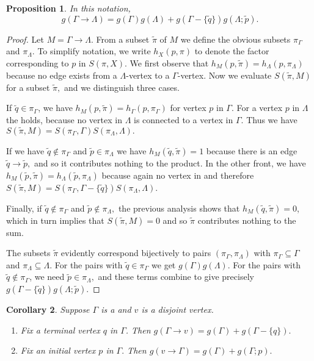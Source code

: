 \documentclass[draft]{article}
\newcommand{\qo}{\tilde{q}}
\newcommand{\pin}{\tilde{p}}
\newcommand{\tilpi}{\tilde{\pi}}
\newcommand{\piga}{\pi_\Gamma}
\newcommand{\pila}{\pi_\Lambda}
\theoremstyle{plain}
\newtheorem{prop}{Proposition}[section]
\newtheorem{cor}[prop]{Corollary}
\theoremstyle{definition}
\begin{document}
\begin{prop}
	In this notation, \eqnspace \begin{equation*} g(\Gamma \rightarrow \Lambda) = g(\Gamma)g(\Lambda) + g(\Gamma - \{\qo\})g(\Lambda; \pin). \end{equation*}
\end{prop}
\begin{proof}
	Let $M = \Gamma \rightarrow \Lambda.$ From a subset $\tilpi$ of $M$ we define the obvious subsets $\piga$ and $\pila.$ To simplify notation, we write $h_X(p, \pi)$ to denote the factor corresponding to $p$ in $S(\pi, X).$ We first observe that $h_M(p, \tilpi) = h_\Lambda(p, \pila)$ because no edge exists from a $\Lambda$-vertex to a $\Gamma$-vertex. Now we evaluate $S(\tilpi, M)$ for a subset $\tilpi,$ and we distinguish three cases.
	
	
	If $\qo \in \piga$, we have $h_M(p, \tilpi) = h_\Gamma(p, \piga)$ for vertex $p$ in $\Gamma$. For a vertex $p$ in $\Lambda$ the holds, because no vertex in $\Lambda$ is connected to a vertex in $\Gamma$. Thus we have $S(\tilpi, M) = S(\piga, \Gamma)S(\pila, \Lambda).$
	
	If we have $\qo\notin\piga$ and $\pin \in \pila$ we have $h_M(\qo, \tilpi) = 1$ because there is an edge $\qo \rightarrow \pin,$ and so it contributes nothing to the product. In the other front, we have $h_M(\pin, \tilpi) = h_\Lambda(\pin, \pila)$ because again no vertex in and therefore $S(\tilpi, M) = S(\piga, \Gamma - \{\qo\})S(\pila, \Lambda)$.
	
	Finally, if $\qo \notin \piga$ and $\pin\notin\pila,$ the previous analysis shows that $h_M(\qo, \tilpi) = 0$, which in turn implies that $S(\tilpi, M) = 0$ and so $\tilpi$ contributes nothing to the sum.
	
	The subsets $\tilpi$ evidently correspond bijectively to pairs $(\piga, \pila)$ with $\piga \subseteq \Gamma$ and $\pila \subseteq \Lambda.$ For the pairs with $\qo \in \piga$ we get $g(\Gamma)g(\Lambda)$. For the pairs with $\qo \notin \piga$, we need $\pin \in \pila,$ and these terms combine to give precisely $g(\Gamma - \{\qo\})g(\Lambda; \pin).$
\end{proof}

\begin{cor} Suppose $\Gamma$ is a \hg and $v$ is a disjoint vertex.\listspace
	\begin{enumerate} \listspace
		\item Fix a terminal vertex $q$ in $\Gamma$. Then $g(\Gamma \rightarrow v) = g(\Gamma) + g(\Gamma - \{q\}).$
		\item Fix an initial vertex $p$ in $\Gamma.$ Then $g(v \rightarrow \Gamma) = g(\Gamma) + g(\Gamma; p).$
	\end{enumerate}\textspace
\end{cor}
\end{document}
